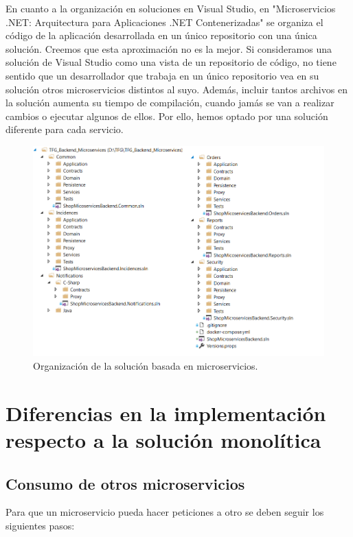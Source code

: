 \documentclass[11pt,spanish,listoffigures]{tfgetsinf}
\begin{document}
En cuanto a la organización en soluciones en Visual Studio, en "Microservicios .NET: Arquitectura para Aplicaciones .NET Contenerizadas" se organiza el código de la aplicación desarrollada en un único repositorio con una única solución. \cite{DelaTorre2018} Creemos que esta aproximación no es la mejor. Si consideramos una solución de Visual Studio como una vista de un repositorio de código, no tiene sentido que un desarrollador que trabaja en un único repositorio vea en su solución otros microservicios distintos al suyo. Además, incluir tantos archivos en la solución aumenta su tiempo de compilación, cuando jamás se van a realizar cambios o ejecutar algunos de ellos. Por ello, hemos optado por una solución diferente para cada servicio.

\begin{figure}[h]
\centering
\includegraphics[scale=0.85]{MicroservicesSolution}
\caption{Organización de la solución basada en microservicios.}
\end{figure}

\section{Diferencias en la implementación respecto a la solución monolítica}

\subsection{Consumo de otros microservicios} \label{subsect:Consumo}

Para que un microservicio pueda hacer peticiones a otro se deben seguir los siguientes pasos:
\end{document}
